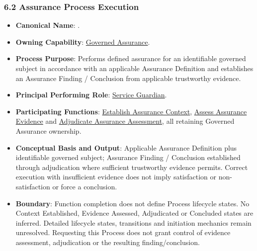 \label{rad:processes:367}
\subsubsection*{6.2 Assurance Process Execution}
\label{rad:processes:369}

\begin{itemize}

\item
\textbf{Canonical Name}: \texttt{}.



\item
\textbf{Owning Capability}: \hyperref[rad:enabling:694]{Governed Assurance}.



\item
\textbf{Process Purpose}: Performs defined assurance for an identifiable governed subject in accordance with an applicable Assurance Definition and establishes an Assurance Finding /\allowbreak{} Conclusion from applicable trustworthy evidence.



\item
\textbf{Principal Performing Role}: \href{https://github.com/fhirfactory/harmonia/blob/98410db60155198a75f74c79d98060070209faa1/docs/markdown/03-business-architecture/actors-roles/roles.md\#service-guardian}{Service Guardian}.



\item
\textbf{Participating Functions}: \hyperref[rad:assurance:98]{Establish Assurance Context}, \hyperref[rad:assurance:108]{Assess Assurance Evidence} and \hyperref[rad:assurance:116]{Adjudicate Assurance Assessment}, all retaining Governed Assurance ownership.



\item
\textbf{Conceptual Basis and Output}: Applicable Assurance Definition plus identifiable governed subject; Assurance Finding /\allowbreak{} Conclusion established through adjudication where sufficient trustworthy evidence permits. Correct execution with insufficient evidence does not imply satisfaction or non-satisfaction or force a conclusion.



\item
\textbf{Boundary}: Function completion does not define Process lifecycle states. No Context Established, Evidence Assessed, Adjudicated or Concluded states are inferred. Detailed lifecycle states, transitions and initiation mechanics remain unresolved. Requesting this Process does not grant control of evidence assessment, adjudication or the resulting finding/\allowbreak{}conclusion.



\end{itemize}
\label{rad:processes:377}

